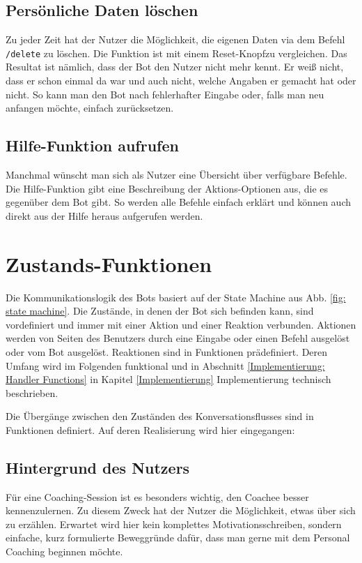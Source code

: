         \subsection{Persönliche Daten löschen}
            Zu jeder Zeit hat der Nutzer die Möglichkeit, die eigenen Daten via dem Befehl \verb|/delete| zu löschen. Die Funktion ist mit einem \glqq Reset-Knopf\grqq  zu vergleichen. Das Resultat ist nämlich, dass der Bot den Nutzer nicht mehr kennt. Er weiß nicht, dass er schon einmal da war und auch nicht, welche Angaben er gemacht hat oder nicht. So kann man den Bot nach fehlerhafter Eingabe oder, falls man neu anfangen möchte, einfach zurücksetzen.
        
        \subsection{Hilfe-Funktion aufrufen}
            Manchmal wünscht man sich als Nutzer eine Übersicht über verfügbare Befehle. Die Hilfe-Funktion gibt eine Beschreibung der Aktions-Optionen aus, die es gegenüber dem Bot gibt. So werden alle Befehle einfach erklärt und können auch direkt aus der Hilfe heraus aufgerufen werden.  



    \section{Zustands-Funktionen} \label{Realisierung: state functions}
        Die Kommunikationslogik des Bots basiert auf der State Machine aus Abb. \ref*{fig: state machine}. Die Zustände, in denen der Bot sich befinden kann, sind vordefiniert und immer mit einer Aktion und einer Reaktion verbunden. Aktionen werden von Seiten des Benutzers durch eine Eingabe oder einen Befehl ausgelöst oder vom Bot ausgelöst. Reaktionen sind in Funktionen prädefiniert. Deren Umfang wird im Folgenden funktional und in Abschnitt \ref*{Implementierung: Handler Functions} in Kapitel \ref{Implementierung} Implementierung technisch beschrieben.
            
        Die Übergänge zwischen den Zuständen des Konversationsflusses sind in Funktionen definiert. Auf deren Realisierung wird hier eingegangen:
        
        \subsection{Hintergrund des Nutzers}
            Für eine Coaching-Session ist es besonders wichtig, den Coachee besser kennenzulernen. Zu diesem Zweck hat der Nutzer die Möglichkeit, etwas über sich zu erzählen. Erwartet wird hier kein komplettes Motivationsschreiben, sondern einfache, kurz formulierte Beweggründe dafür, dass man gerne mit dem Personal Coaching beginnen möchte. 
        
